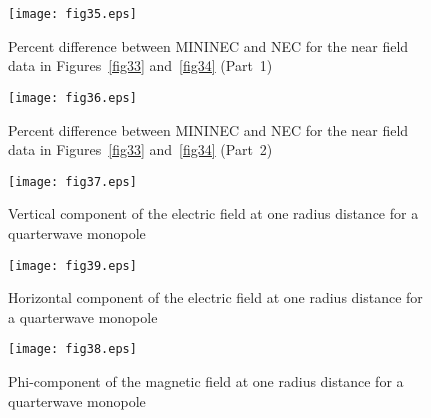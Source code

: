\documentclass[12pt]{article}
\begin{document}
\begin{sidewaysfigure}[htb]
\centerline{\texttt{[image: fig35.eps]}}
\caption{Percent difference between MININEC and NEC for the near field
data in Figures~\ref{fig33} and~\ref{fig34} (Part~1)}
\label{fig35}
\end{sidewaysfigure}

\begin{sidewaysfigure}[htb]
\centerline{\texttt{[image: fig36.eps]}}
\caption{Percent difference between MININEC and NEC for the near field
data in Figures~\ref{fig33} and~\ref{fig34} (Part~2)}
\label{fig36}
\end{sidewaysfigure}

\begin{figure}[htb]
\centerline{\texttt{[image: fig37.eps]}}
\caption{Vertical component of the electric field at one radius distance
for a quarterwave monopole}
\label{fig37}
\end{figure}

\begin{figure}[htb]
\centerline{\texttt{[image: fig39.eps]}}
\caption{Horizontal component of the electric field at one radius distance
for a quarterwave monopole}
\label{fig38}
\end{figure}

\begin{figure}[htb]
\centerline{\texttt{[image: fig38.eps]}}
\caption{Phi-component of the magnetic field at one radius distance
for a quarterwave monopole}
\label{fig39}
\end{figure}
\end{document}
